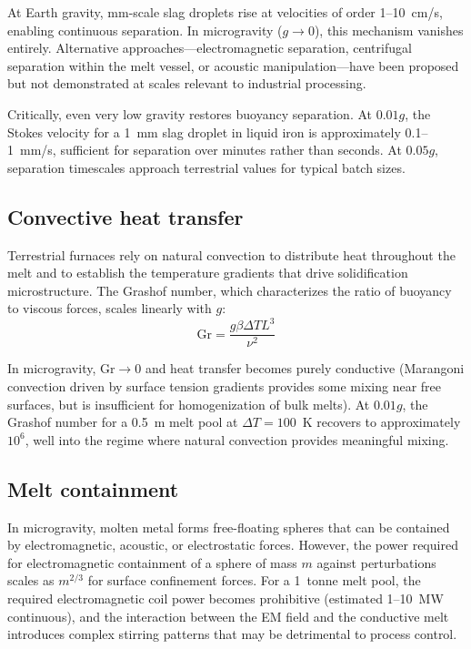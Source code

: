 \documentclass[preprint,12pt]{elsarticle}
\begin{document}
At Earth gravity, mm-scale slag droplets rise at velocities of order 1--10~cm/s, enabling continuous separation. In microgravity ($g \to 0$), this mechanism vanishes entirely. Alternative approaches---electromagnetic separation, centrifugal separation within the melt vessel, or acoustic manipulation---have been proposed but not demonstrated at scales relevant to industrial processing.

Critically, even very low gravity restores buoyancy separation. At $0.01g$, the Stokes velocity for a 1~mm slag droplet in liquid iron is approximately 0.1--1~mm/s, sufficient for separation over minutes rather than seconds. At $0.05g$, separation timescales approach terrestrial values for typical batch sizes.

\subsection{Convective heat transfer}

Terrestrial furnaces rely on natural convection to distribute heat throughout the melt and to establish the temperature gradients that drive solidification microstructure. The Grashof number, which characterizes the ratio of buoyancy to viscous forces, scales linearly with $g$:
\begin{equation}
    \mathrm{Gr} = \frac{g \beta \Delta T L^3}{\nu^2}
    \label{eq:grashof}
\end{equation}

In microgravity, $\mathrm{Gr} \to 0$ and heat transfer becomes purely conductive (Marangoni convection driven by surface tension gradients provides some mixing near free surfaces, but is insufficient for homogenization of bulk melts). At $0.01g$, the Grashof number for a 0.5~m melt pool at $\Delta T = 100$~K recovers to approximately $10^6$, well into the regime where natural convection provides meaningful mixing.

\subsection{Melt containment}

In microgravity, molten metal forms free-floating spheres that can be contained by electromagnetic, acoustic, or electrostatic forces. However, the power required for electromagnetic containment of a sphere of mass $m$ against perturbations scales as $m^{2/3}$ for surface confinement forces. For a 1~tonne melt pool, the required electromagnetic coil power becomes prohibitive (estimated 1--10~MW continuous), and the interaction between the EM field and the conductive melt introduces complex stirring patterns that may be detrimental to process control.
\end{document}
